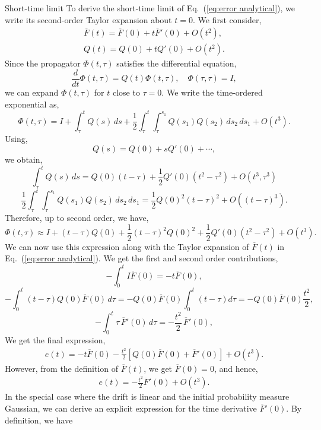 \documentclass[11pt, a4paper, oneside, reqno]{amsart}
\makeatletter
\def\subsection{\@startsection{subsection}{2}%
	\z@{.5\linespacing\@plus.7\linespacing}{.5\linespacing}%
	{\normalfont\large\bfseries}}
\makeatother
\begin{document}
\subsection{Short-time limit}
\noindent To derive the short-time limit of Eq.~(\ref{eq:error analytical}), we write its second-order Taylor expansion about $t=0$. We first consider, 
\begin{eqnarray}
    \overline{F}(t) = \overline{F}(0) + t\overline{F}'(0) + O(t^2),\\
    Q(t) = Q(0) + tQ'(0) + O(t^2).
\end{eqnarray}
Since the propagator \(\Phi(t, \tau)\) satisfies the differential equation,
\[
\frac{d}{dt} \Phi(t, \tau) = Q(t) \Phi(t, \tau), \quad \Phi(\tau, \tau) = I,
\]
we can expand \(\Phi(t, \tau)\) for \(t\) close to \(\tau = 0\). We write the time-ordered exponential as,
\[
\Phi(t, \tau) = I + \int_{\tau}^{t} Q(s) \, ds + \frac{1}{2} \int_{\tau}^{t} \int_{\tau}^{s_1} Q(s_1) Q(s_2) \, ds_2 \, ds_1 + O(t^3).
\]
Using,
\[
Q(s) = Q(0) + s Q'(0) + \cdots,
\]
we obtain,
\[
\int_{\tau}^{t} Q(s) \, ds = Q(0)(t - \tau) + \frac{1}{2} Q'(0)(t^2 - \tau^2) + O(t^3, \tau^3)
\]
\[
\frac{1}{2} \int_{\tau}^{t} \int_{\tau}^{s_1} Q(s_1) Q(s_2) \, ds_2 \, ds_1 = \frac{1}{2} Q(0)^2(t - \tau)^2 + O((t-\tau)^3).
\]
Therefore, up to second order, we have,
\[
\Phi(t, \tau) \approx I + (t - \tau) Q(0) + \frac{1}{2} (t - \tau)^2 Q(0)^2 + \frac{1}{2}Q'(0)(t^2-\tau^2) + O(t^3).
\]
We can now use this expression along with the Taylor expansion of $\overline{F}(t)$ in Eq.~(\ref{eq:error analytical}). We get the first and second order contributions,
\[
-\int_0^t I \overline{F}(0) = -t\overline{F}(0),
\]
\[
-\int_0^t (t - \tau) Q(0) \overline{F}(0) \, d\tau = -Q(0) \overline{F}(0) \int_0^t (t - \tau) d\tau = -Q(0) \overline{F}(0) \frac{t^2}{2},
\]
\[
-\int_0^t \tau \, \overline{F}'(0) \, d\tau = -\frac{t^2}{2} \, \overline{F}'(0),
\]
We get the final expression,
\begin{eqnarray}
    e(t) = -t\overline{F}(0) - \frac{t^2}{2}[Q(0)\overline{F}(0)+\overline{F}'(0)] + O(t^3).
\end{eqnarray}
However, from the definition of $\overline{F}(t)$, we get $\overline{F}(0)=0$, and hence,
\begin{eqnarray}
    e(t) =  -\frac{t^2}{2}\overline{F}'(0) + O(t^3).
\end{eqnarray}
In the special case where the drift is linear and the initial probability measure Gaussian, we can derive an explicit expression for the time derivative $\overline{F}'(0)$. By definition, we have
\end{document}
